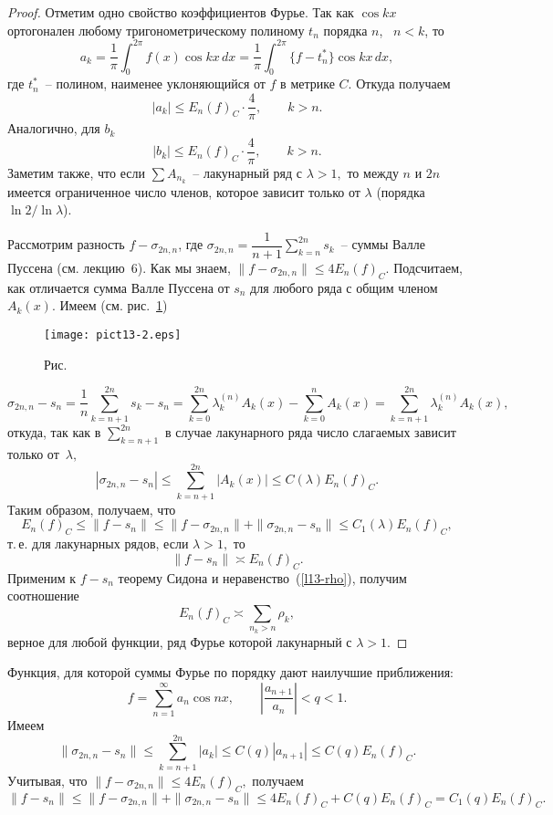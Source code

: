 \begin{proof}
Отметим одно свойство коэффициентов Фурье. Так как $\cos kx$ ортогонален
любому тригонометрическому полиному $t_n$ порядка $n$,~ $n<k$, то
$$
a_k=\frac{1}{\pi}\int_0^{2\pi} f(x)\cos kx\, dx=\frac{1}{\pi} \int_0^{2\pi}
\{ f-t_n^*\} \cos kx \, dx,
$$
где $t_n^*$~-- полином, наименее уклоняющийся от $f$ в метрике $C$. Откуда получаем
$$
|a_k|\le E_n(f)_C\cdot \frac{4}{\pi}, \qquad {k>n}.
$$
Аналогично, для $b_k$
$$
|b_k|\le E_n(f)_C\cdot \frac{4}{\pi}, \qquad {k>n}.
$$
Заметим также, что если $\sum A_{n_k}$~-- лакунарный ряд с $\lambda>1,$
то между $n$ и $2n$
имеется ограниченное число членов, которое зависит только от $\lambda$
(порядка $\ln 2/ \ln \lambda$).

Рассмотрим разность $f-\sigma_{2n,n}$, где $\sigma_{2n,n}=\dfrac{1}{n+1}
\sum\limits_{k=n}^{2n} s_k$~-- суммы Валле Пуссена (см. лекцию~6). Как мы знаем,
$\|f-\sigma_{2n,n}\|\le 4E_n(f)_C$. Подсчитаем, как отличается сумма Валле
Пуссена от $s_n$ {для любого ряда с общим членом $A_k(x)$. Имеем
{(см. рис.~\ref{r13-2})}}

 \bigskip
\begin{figure}[ht]
\begin{center}
\texttt{[image: pict13-2.eps]}
\end{center}
 \bigskip
 \label{r13-2}

 \centerline{Рис.~\theris}
 \bigskip
\end{figure}


$$
\sigma_{2n,n}-s_n=\frac{1}{n}\sum\limits_{k=n+1}^{2n}
s_k-s_n=\sum\limits_{k=0}^{2n}\lambda_k^{(n)} A_k(x)-\sum\limits_{k=0}^n A_k(x)=
{\sum\limits_{k=n+1}^{2n}\lambda_k^{(n)} A_k(x)},
$$
откуда, так как в $\sum\limits_{k=n+1}^{2n}$ {в случае лакунарного ряда} число
слагаемых зависит только от~$\lambda,$
$$
|\sigma_{2n,n}-s_n|\le \sum\limits_{k=n+1}^{2n} |A_k(x)|\le C(\lambda)
E_n(f)_C.
$$
Таким образом, получаем, что
$$
E_n(f)_C\le \| f-s_n\|\le
\|f-\sigma_{2n,n}\|+\|\sigma_{2n,n}-s_n\|\le C_1(\lambda) E_n(f)_C,
$$
т.\,е. для лакунарных рядов, если $\lambda>1,$ то
$$
\|f-s_n\|\asymp E_n(f)_C.
$$
Применим к $f-s_n$ теорему Сидона и неравенство~(\ref{l13-rho}),
получим {соотношение}
$$
E_n(f)_C\asymp \sum\limits_{n_k>n}\rho_k,
$$
верное для любой функции, ряд Фурье которой лакунарный с $\lambda>1$.
\end{proof}

\begin{Example}
Функция, для которой суммы Фурье по порядку дают наилучшие приближения:
$$
f=\sum\limits_{n=1}^{\infty} a_n\cos nx,\qquad \left| \frac{a_{n+1}}{a_n}\right|<q<1.
$$
Имеем
$$
\|\sigma_{2n,n}-s_n\|\le \sum\limits_{k=n+1}^{2n} |a_k|\le C(q)|a_{n+1}|\le
C(q) E_n(f)_C.
$$
Учитывая, что $\|f-\sigma_{2n,n}\|\le 4E_n(f)_C,$
получаем
$$
\|f-s_n\|\le \|f-\sigma_{2n,n}\|+\|\sigma_{2n,n}-s_n\|\le
4E_n(f)_C+C(q)E_n(f)_C=C_1(q)E_n(f)_C.
$$
\end{Example}

